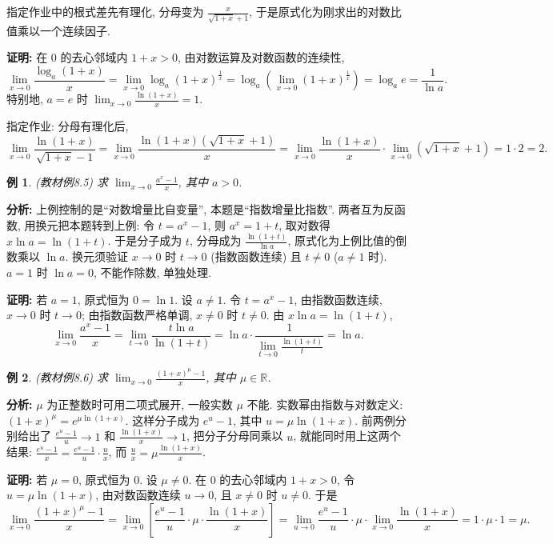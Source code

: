 \documentclass[UTF8,openany]{ctexbook}
\theoremstyle{chinesetextbook}
\newtheorem{example}{例}[section]
\newenvironment{cnproof}{\par\indent\textbf{证明:} \ignorespaces}{\par}
\begin{document}
指定作业中的根式差先有理化, 分母变为 $\displaystyle\frac{x}{\sqrt{1+x}+1}$, 于是原式化为刚求出的对数比值乘以一个连续因子.
\begin{cnproof}
在 $0$ 的去心邻域内 $1+x>0$, 由对数运算及对数函数的连续性,
\[
\lim_{x\to0}\frac{\log_a(1+x)}x
=\lim_{x\to0}\log_a(1+x)^{\frac1x}
=\log_a\left(\lim_{x\to0}(1+x)^{\frac1x}\right)
=\log_ae=\frac1{\ln a}.
\]
特别地, $a=e$ 时 $\displaystyle\lim_{x\to0}\frac{\ln(1+x)}x=1$.

指定作业: 分母有理化后,
\[
\lim_{x\to0}\frac{\ln(1+x)}{\sqrt{1+x}-1}
=\lim_{x\to0}\frac{\ln(1+x)\left(\sqrt{1+x}+1\right)}{x}
=\lim_{x\to0}\frac{\ln(1+x)}x\cdot\lim_{x\to0}\left(\sqrt{1+x}+1\right)=1\cdot2=2.
\]
\end{cnproof}
\begin{example}
\textnormal{(教材例8.5)} 求 $\displaystyle \lim_{x\to0}\frac{a^x-1}x$, 其中 $a>0$.
\end{example}
\par\indent\textbf{分析:} 上例控制的是“对数增量比自变量”, 本题是“指数增量比指数”. 两者互为反函数, 用换元把本题转到上例: 令 $t=a^x-1$, 则 $a^x=1+t$, 取对数得 $x\ln a=\ln(1+t)$. 于是分子成为 $t$, 分母成为 $\displaystyle\frac{\ln(1+t)}{\ln a}$, 原式化为上例比值的倒数乘以 $\ln a$. 换元须验证 $x\to0$ 时 $t\to0$ (指数函数连续) 且 $t\ne0$ ($a\ne1$ 时). $a=1$ 时 $\ln a=0$, 不能作除数, 单独处理.
\begin{cnproof}
若 $a=1$, 原式恒为 $0=\ln1$. 设 $a\ne1$. 令 $t=a^x-1$, 由指数函数连续, $x\to0$ 时 $t\to0$; 由指数函数严格单调, $x\ne0$ 时 $t\ne0$. 由 $x\ln a=\ln(1+t)$,
\[
\lim_{x\to0}\frac{a^x-1}x
=\lim_{t\to0}\frac{t\ln a}{\ln(1+t)}
=\ln a\cdot\frac1{\displaystyle\lim_{t\to0}\frac{\ln(1+t)}t}=\ln a.
\]
\end{cnproof}
\begin{example}
\textnormal{(教材例8.6)} 求 $\displaystyle \lim_{x\to0}\frac{(1+x)^\mu-1}x$, 其中 $\mu\in\mathbb R$.
\end{example}
\par\indent\textbf{分析:} $\mu$ 为正整数时可用二项式展开, 一般实数 $\mu$ 不能. 实数幂由指数与对数定义: $(1+x)^\mu=e^{\mu\ln(1+x)}$. 这样分子成为 $e^u-1$, 其中 $u=\mu\ln(1+x)$. 前两例分别给出了 $\displaystyle\frac{e^u-1}u\to1$ 和 $\displaystyle\frac{\ln(1+x)}x\to1$, 把分子分母同乘以 $u$, 就能同时用上这两个结果: $\displaystyle\frac{e^u-1}x=\frac{e^u-1}u\cdot\frac ux$, 而 $\displaystyle\frac ux=\mu\frac{\ln(1+x)}x$.
\begin{cnproof}
若 $\mu=0$, 原式恒为 $0$. 设 $\mu\ne0$. 在 $0$ 的去心邻域内 $1+x>0$, 令 $u=\mu\ln(1+x)$, 由对数函数连续 $u\to0$, 且 $x\ne0$ 时 $u\ne0$. 于是
\[
\lim_{x\to0}\frac{(1+x)^\mu-1}x
=\lim_{x\to0}\left[\frac{e^u-1}u\cdot\mu\cdot\frac{\ln(1+x)}x\right]
=\lim_{u\to0}\frac{e^u-1}u\cdot\mu\cdot\lim_{x\to0}\frac{\ln(1+x)}x
=1\cdot\mu\cdot1=\mu.
\]
\end{cnproof}
\end{document}
